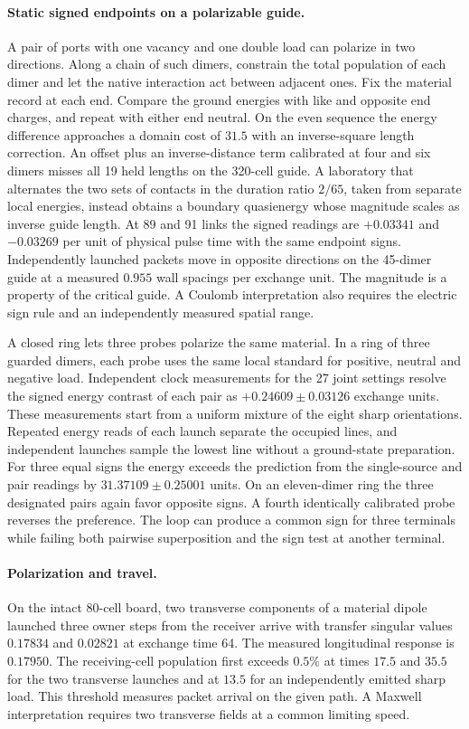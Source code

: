 \documentclass[11pt]{article}
\theoremstyle{definition}
\theoremstyle{remark}
\theoremstyle{plain}
\begin{document}
\paragraph{Static signed endpoints on a polarizable guide.}
A pair of ports with one vacancy and one double load can polarize in two
directions. Along a chain of such dimers, constrain the total population
of each dimer and let the native interaction act between adjacent ones.
Fix the material record at each end. Compare the ground energies with
like and opposite end charges, and repeat with either end neutral. On
the even sequence the energy difference approaches a domain cost of
$31.5$ with an inverse-square length correction. An offset plus an
inverse-distance term calibrated at four and six dimers misses all
19 held lengths on the 320-cell guide. A laboratory that alternates
the two sets of contacts in the duration ratio $2/65$, taken from
separate local energies, instead obtains a boundary quasienergy whose
magnitude scales as inverse guide length. At 89 and 91 links the
signed readings are $+0.03341$ and $-0.03269$ per unit of physical
pulse time with the same endpoint signs. Independently launched packets
move in opposite directions on the 45-dimer guide at a measured
$0.955$ wall spacings per exchange unit. The magnitude is a property
of the critical guide. A Coulomb interpretation also requires the
electric sign rule and an independently measured spatial range.

A closed ring lets three probes polarize the same material. In a ring
of three guarded dimers, each probe uses the same local standard for
positive, neutral and negative load. Independent clock measurements
for the 27 joint settings resolve the signed energy contrast of each
pair as $+0.24609\pm0.03126$ exchange units. These measurements start
from a uniform mixture of the eight sharp orientations. Repeated energy
reads of each launch separate the occupied lines, and independent
launches sample the lowest line without a ground-state preparation.
For three equal signs the energy exceeds the prediction from the
single-source and pair readings by $31.37109\pm0.25001$ units.
On an eleven-dimer ring the three designated pairs again favor opposite
signs. A fourth identically calibrated probe reverses the preference.
The loop can produce a common sign for three terminals while failing
both pairwise superposition and the sign test at another terminal.

\paragraph{Polarization and travel.}
On the intact 80-cell board, two transverse components of a material
dipole launched three owner steps from the receiver arrive with
transfer singular values $0.17834$ and $0.02821$ at exchange time 64.
The measured longitudinal response is $0.17950$. The receiving-cell
population first exceeds $0.5\%$ at times $17.5$ and $35.5$ for the
two transverse launches and at $13.5$ for an independently emitted
sharp load. This threshold measures packet arrival on the given path.
A Maxwell interpretation requires two transverse fields at a common
limiting speed.
\end{document}
